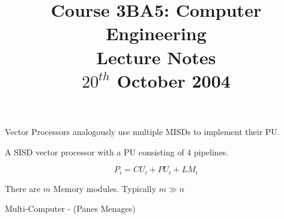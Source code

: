 \documentclass[a4paper,12pt]{article}
\begin{document}
\title{Course 3BA5: Computer Engineering \\ Lecture Notes \\ $20^{th}$ October 2004}

\maketitle

\begin{table}[hbtp]


\caption{Vector Processors analogously use multiple MISDs to implement
their PU.}

\end{table}


\begin{table}[hbtp]


\caption{A SISD vector processor with a PU consisting of 4 pipelines.}

\end{table}

\begin{table}[hbtp]


\hspace{10mm}

\[ P_{i} = CU_{i} + PU_{i} + LM_{i} \]

\caption{There are $m$ Memory modules. Typically $m \gg n$}

\end{table}

\begin{table}[hbtp]


\caption{Multi-Computer - (Panes Menages)}

\end{table}
\end{document}

